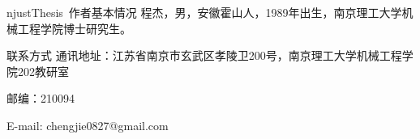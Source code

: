 
\begin{resume}

\begin{resumesection}{njustThesis~作者基本情况}
程杰，男，安徽霍山人，1989年出生，南京理工大学机械工程学院博士研究生。
\end{resumesection}

\begin{resumelist}{联系方式}
通讯地址：江苏省南京市玄武区孝陵卫200号，南京理工大学机械工程学院202教研室

邮编：210094

E-mail: chengjie0827@gmail.com
\end{resumelist}

\end{resume}
